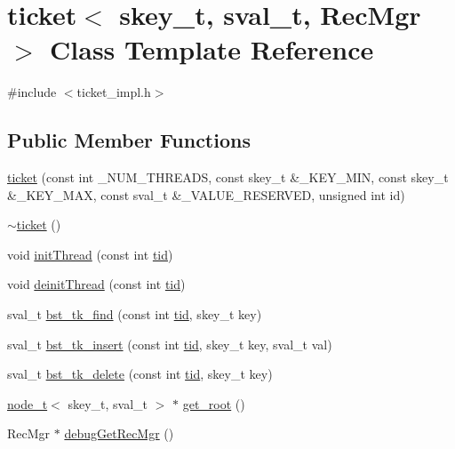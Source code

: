 \hypertarget{classticket}{}\section{ticket$<$ skey\+\_\+t, sval\+\_\+t, Rec\+Mgr $>$ Class Template Reference}
\label{classticket}


{\ttfamily \#include $<$ticket\+\_\+impl.\+h$>$}

\subsection*{Public Member Functions}
\begin{DoxyCompactItemize}
\item 
\hyperlink{classticket_aecd4fbf1e68e74e9959ce2f5e2b05bf5}{ticket} (const int \+\_\+\+N\+U\+M\+\_\+\+T\+H\+R\+E\+A\+DS, const skey\+\_\+t \&\+\_\+\+K\+E\+Y\+\_\+\+M\+IN, const skey\+\_\+t \&\+\_\+\+K\+E\+Y\+\_\+\+M\+AX, const sval\+\_\+t \&\+\_\+\+V\+A\+L\+U\+E\+\_\+\+R\+E\+S\+E\+R\+V\+ED, unsigned int id)
\item 
\hyperlink{classticket_ac4b9d890af8742df497a89a926dccde9}{$\sim$ticket} ()
\item 
void \hyperlink{classticket_a87fe7b99876fa33696c931c234051d54}{init\+Thread} (const int \hyperlink{microbench_2main_8cpp_a9ca9869868fe7e7a38a921cc7de4103f}{tid})
\item 
void \hyperlink{classticket_a7fdba09ca002de28d968fb5e2540dc45}{deinit\+Thread} (const int \hyperlink{microbench_2main_8cpp_a9ca9869868fe7e7a38a921cc7de4103f}{tid})
\item 
sval\+\_\+t \hyperlink{classticket_a89a2bc20f3d0b46c9e0b94e43f5bc05f}{bst\+\_\+tk\+\_\+find} (const int \hyperlink{microbench_2main_8cpp_a9ca9869868fe7e7a38a921cc7de4103f}{tid}, skey\+\_\+t key)
\item 
sval\+\_\+t \hyperlink{classticket_ad6c01e82fc3074b7bbbc0dbb3bb75c43}{bst\+\_\+tk\+\_\+insert} (const int \hyperlink{microbench_2main_8cpp_a9ca9869868fe7e7a38a921cc7de4103f}{tid}, skey\+\_\+t key, sval\+\_\+t val)
\item 
sval\+\_\+t \hyperlink{classticket_a4fc1111d09c54bc5d7b40d26dde1efdf}{bst\+\_\+tk\+\_\+delete} (const int \hyperlink{microbench_2main_8cpp_a9ca9869868fe7e7a38a921cc7de4103f}{tid}, skey\+\_\+t key)
\item 
\hyperlink{structnode__t}{node\+\_\+t}$<$ skey\+\_\+t, sval\+\_\+t $>$ $\ast$ \hyperlink{classticket_a045f514bd329f9e22e62ef6671d07833}{get\+\_\+root} ()
\item 
Rec\+Mgr $\ast$ \hyperlink{classticket_abc8a9c97c3e1ae76f106f4f8eba0e6f0}{debug\+Get\+Rec\+Mgr} ()
\end{DoxyCompactItemize}


